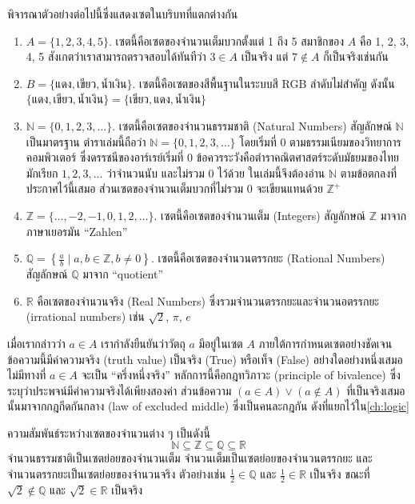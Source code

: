 \begin{ex}
\label{ex:set-contexts}
พิจารณาตัวอย่างต่อไปนี้ซึ่งแสดงเซตในบริบทที่แตกต่างกัน

\begin{enumerate}
    \item[(ก)] $A = \{1, 2, 3, 4, 5\}$. เซตนี้คือเซตของจำนวนเต็มบวกตั้งแต่ 1 ถึง 5 สมาชิกของ $A$ คือ 1, 2, 3, 4, 5 สังเกตว่าเราสามารถตรวจสอบได้ทันทีว่า $3 \in A$ เป็นจริง แต่ $7 \notin A$ ก็เป็นจริงเช่นกัน
    \item[(ข)] $B = \{\text{แดง}, \text{เขียว}, \text{น้ำเงิน}\}$. เซตนี้คือเซตของสีพื้นฐานในระบบสี RGB ลำดับไม่สำคัญ ดังนั้น $\{\text{แดง}, \text{เขียว}, \text{น้ำเงิน}\} = \{\text{เขียว}, \text{แดง}, \text{น้ำเงิน}\}$
    \item[(ค)] $\mathbb{N} = \{0, 1, 2, 3, \ldots\}$. เซตนี้คือเซตของจำนวนธรรมชาติ (Natural Numbers) สัญลักษณ์ $\mathbb{N}$ เป็นมาตรฐาน ตำราเล่มนี้ถือว่า $\mathbb{N} = \{0, 1, 2, 3, \ldots\}$ โดยเริ่มที่ 0 ตามธรรมเนียมของวิทยาการคอมพิวเตอร์ ซึ่งดรรชนีของอาร์เรย์เริ่มที่ 0 ข้อควรระวังคือตำราคณิตศาสตร์ระดับมัธยมของไทยมักเรียก $1, 2, 3, \ldots$ ว่าจำนวนนับ และไม่รวม 0 ไว้ด้วย ในเล่มนี้จึงต้องอ่าน $\mathbb{N}$ ตามข้อตกลงที่ประกาศไว้นี้เสมอ ส่วนเซตของจำนวนเต็มบวกที่ไม่รวม 0 จะเขียนแทนด้วย $\mathbb{Z}^+$
    \item[(ง)] $\mathbb{Z} = \{\ldots, -2, -1, 0, 1, 2, \ldots\}$. เซตนี้คือเซตของจำนวนเต็ม (Integers) สัญลักษณ์ $\mathbb{Z}$ มาจากภาษาเยอรมัน ``Zahlen''
    \item[(จ)] $\mathbb{Q} = \left\{\frac{a}{b} \mid a, b \in \mathbb{Z}, b \neq 0\right\}$. เซตนี้คือเซตของจำนวนตรรกยะ (Rational Numbers) สัญลักษณ์ $\mathbb{Q}$ มาจาก ``quotient''
    \item[(ฉ)] $\mathbb{R}$ คือเซตของจำนวนจริง (Real Numbers) ซึ่งรวมจำนวนตรรกยะและจำนวนอตรรกยะ (irrational numbers) เช่น $\sqrt{2}$, $\pi$, $e$
\end{enumerate}
เมื่อเรากล่าวว่า $a \in A$ เรากำลังยืนยันว่าวัตถุ $a$ มีอยู่ในเซต $A$ ภายใต้การกำหนดเซตอย่างชัดเจน ข้อความนี้มีค่าความจริง (truth value) เป็นจริง (True) หรือเท็จ (False) อย่างใดอย่างหนึ่งเสมอ ไม่มีทางที่ $a \in A$ จะเป็น ``ครึ่งหนึ่งจริง'' หลักการนี้คือกฎทวิภาวะ (principle of bivalence) ซึ่งระบุว่าประพจน์มีค่าความจริงได้เพียงสองค่า ส่วนข้อความ $(a \in A) \lor (a \notin A)$ ที่เป็นจริงเสมอนั้นมาจากกฎกีดกันกลาง (law of excluded middle) ซึ่งเป็นคนละกฎกัน ดังที่แยกไว้ใน\autoref{ch:logic}
\end{ex}

\begin{rem}
ความสัมพันธ์ระหว่างเซตของจำนวนต่าง ๆ เป็นดังนี้
\[
\mathbb{N} \subseteq \mathbb{Z} \subseteq \mathbb{Q} \subseteq \mathbb{R}
\]
จำนวนธรรมชาติเป็นเซตย่อยของจำนวนเต็ม จำนวนเต็มเป็นเซตย่อยของจำนวนตรรกยะ และจำนวนตรรกยะเป็นเซตย่อยของจำนวนจริง ตัวอย่างเช่น $\frac{1}{2} \in \mathbb{Q}$ และ $\frac{1}{2} \in \mathbb{R}$ เป็นจริง ขณะที่ $\sqrt{2} \notin \mathbb{Q}$ และ $\sqrt{2} \in \mathbb{R}$ เป็นจริง
\label{rem:number-sets}
\end{rem}

